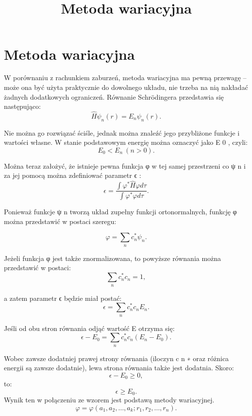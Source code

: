 \documentclass{article}
\begin{document}
\title{Metoda wariacyjna}
\maketitle

\section{Metoda wariacyjna}
W porównaniu z rachunkiem zaburzeń, metoda wariacyjna ma pewną przewagę – może ona być użyta praktycznie do dowolnego układu, nie trzeba na nią nakładać żadnych dodatkowych ograniczeń. Równanie Schrödingera przedstawia się następująco: 
$${ {\hat {H}}\psi _{n}(r)=E_{n}\psi _{n}(r).}$$

Nie można go rozwiązać ściśle, jednak można znaleźć jego przybliżone funkcje i wartości własne. W stanie podstawowym energię można oznaczyć jako E 0 , czyli:
$${ E_{0}<E_{n}~(n>0).}$$

Można teraz założyć, że istnieje pewna funkcja φ  w tej samej przestrzeni co ψ n  i za jej pomocą można zdefiniować parametr ϵ :
$${ \epsilon ={\frac {\int \varphi ^{*}{\hat {H}}\varphi d\tau }{\int \varphi ^{*}\varphi d\tau }}.}$$

Ponieważ funkcje ψ n tworzą układ zupełny funkcji ortonormalnych, funkcję φ  można przedstawić w postaci szeregu:

$${ \varphi =\sum \limits _{n}c_{n}^{*}\psi _{n}.}$$

Jeżeli funkcja φ jest także znormalizowana, to powyższe równania można przedstawić w postaci: 
$${ \sum \limits _{n}c_{n}^{*}c_{n}=1,}$$

a zatem parametr ϵ będzie miał postać: 
$${ \epsilon =\sum \limits _{n}c_{n}^{*}c_{n}E_{n}.}$$

Jeśli od obu stron równania odjąć wartość E otrzyma się: 
$${ \epsilon -E_{0}=\sum \limits _{n}c_{n}^{*}c_{n}(E_{n}-E_{0}).}$$

Wobec zawsze dodatniej prawej strony równania (iloczyn c n ∗ oraz różnica energii są zawsze dodatnie), lewa strona równania także jest dodatnia. Skoro:
$${ \epsilon -E_{0}\geq 0,}$$
to: 
$${ \epsilon \geq E_{0}.}$$
Wynik ten w połączeniu ze wzorem jest podstawą metody wariacyjnej. 
$${ \varphi =\varphi (a_{1},a_{2},\dots ,a_{k};r_{1},r_{2},\dots ,r_{n}).}$$
\end{document}
